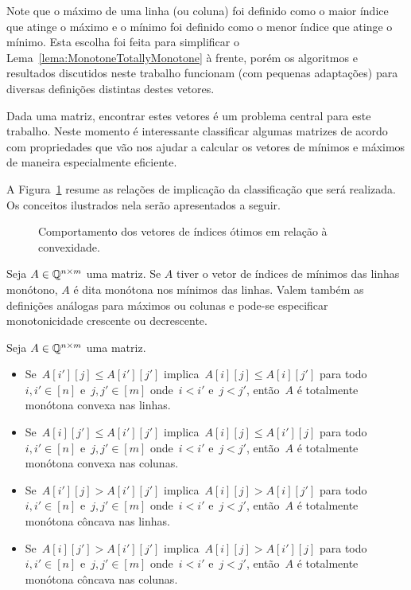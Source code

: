 Note que o máximo de uma linha (ou coluna) foi definido como o maior índice que atinge o máximo e o mínimo foi definido como o menor índice que atinge o mínimo. Esta escolha foi feita para simplificar o Lema~\ref{lema:MonotoneTotallyMonotone} à frente, porém os algoritmos e resultados discutidos neste trabalho funcionam (com pequenas adaptações) para diversas definições distintas destes vetores.  

Dada uma matriz, encontrar estes vetores é um problema central para este trabalho. Neste momento é interessante classificar algumas matrizes de acordo com propriedades que vão nos ajudar a calcular os vetores de mínimos e máximos de maneira especialmente eficiente.   

A Figura~\ref{figure:ConvexMonotone} resume as relações de implicação da classificação que será realizada. Os conceitos ilustrados nela serão apresentados a seguir.

\begin{figure}[t]
    \centering
    
    \caption{Comportamento dos vetores de índices ótimos em relação à convexidade.} \label{figure:ConvexMonotone}
\end{figure}

\begin{defi}
Seja $A \in \mathbb{Q}^{n \times m}$ uma matriz. Se $A$ tiver o vetor de índices de mínimos das linhas monótono, $A$ é dita monótona nos mínimos das linhas. Valem também as definições análogas para máximos ou colunas e pode-se especificar monotonicidade crescente ou decrescente.
\end{defi}

\begin{defi}
Seja $A \in \mathbb{Q}^{n \times m}$ uma matriz.
    \begin{itemize}
        \item Se~$A[i'][j] \leq A[i'][j']$ implica~$A[i][j] \leq A[i][j']$ para todo~${i,i' \in [n]}$ e~${j,j' \in [m]}$ onde~${i<i'}$ e~${j<j'}$, então~$A$ é totalmente monótona convexa nas linhas.
        \item Se~$A[i][j'] \leq A[i'][j']$ implica~$A[i][j] \leq A[i'][j]$ para todo~${i,i' \in [n]}$ e~${j,j' \in [m]}$ onde~${i<i'}$ e~${j<j'}$, então~$A$ é totalmente monótona convexa nas colunas.
        \item Se~$A[i'][j] > A[i'][j']$ implica~$A[i][j] > A[i][j']$ para todo~${i,i' \in [n]}$ e~${j,j' \in [m]}$ onde~${i<i'}$ e~${j<j'}$, então~$A$ é totalmente monótona côncava nas linhas.
        \item Se~$A[i][j'] > A[i'][j']$ implica~$A[i][j] > A[i'][j]$ para todo~${i,i' \in [n]}$ e~${j,j' \in [m]}$ onde~${i<i'}$ e~${j<j'}$, então~$A$ é totalmente monótona côncava nas colunas.
    \end{itemize}
\end{defi}


